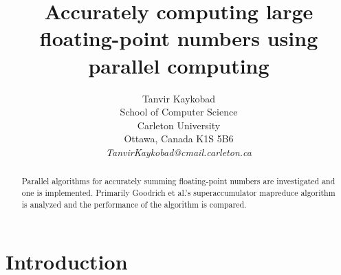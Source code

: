 \documentclass[11pt]{article}       %
\begin{document}


\title{Accurately computing large floating-point numbers using parallel computing}


\author{
Tanvir Kaykobad\\
School of Computer Science\\
Carleton University\\
Ottawa, Canada K1S 5B6\\
{\em TanvirKaykobad@cmail.carleton.ca}
} %

\maketitle

\begin{abstract}
Parallel algorithms for accurately summing floating-point numbers are investigated and one is implemented. Primarily Goodrich et al.'s superaccumulator mapreduce algorithm is analyzed and the performance of the algorithm is compared.
\end{abstract}


\section{Introduction} \label{intro}
\end{document}
